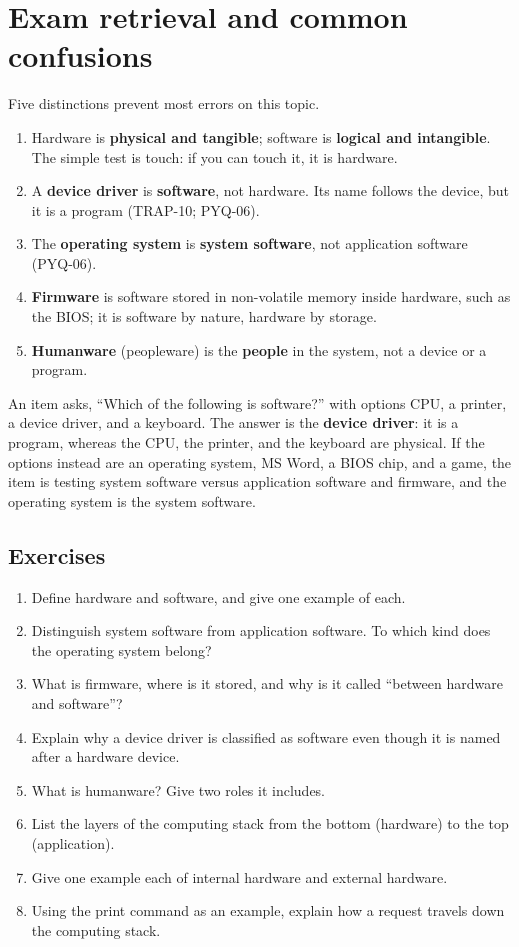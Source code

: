 \section{Exam retrieval and common confusions}
Five distinctions prevent most errors on this topic.
\begin{enumerate}
  \item Hardware is \textbf{physical and tangible}; software is
    \textbf{logical and intangible}. The simple test is touch: if you can
    touch it, it is hardware.
  \item A \textbf{device driver} is \textbf{software}, not hardware. Its name
    follows the device, but it is a program (TRAP-10; PYQ-06).
  \item The \textbf{operating system} is \textbf{system software}, not
    application software (PYQ-06).
  \item \textbf{Firmware} is software stored in non-volatile memory inside
    hardware, such as the BIOS; it is software by nature, hardware by storage.
  \item \textbf{Humanware} (peopleware) is the \textbf{people} in the system,
    not a device or a program.
\end{enumerate}

\begin{example}
An item asks, ``Which of the following is software?'' with options CPU, a
printer, a device driver, and a keyboard. The answer is the \textbf{device
driver}: it is a program, whereas the CPU, the printer, and the keyboard are
physical. If the options instead are an operating system, MS Word, a BIOS
chip, and a game, the item is testing system software versus application
software and firmware, and the operating system is the system software.
\end{example}

\subsection*{Exercises}
\begin{enumerate}[label=\arabic*.]
  \item Define hardware and software, and give one example of each.
  \item Distinguish system software from application software. To which kind
    does the operating system belong?
  \item What is firmware, where is it stored, and why is it called ``between
    hardware and software''?
  \item Explain why a device driver is classified as software even though it
    is named after a hardware device.
  \item What is humanware? Give two roles it includes.
  \item List the layers of the computing stack from the bottom (hardware) to
    the top (application).
  \item Give one example each of internal hardware and external hardware.
  \item Using the print command as an example, explain how a request travels
    down the computing stack.
\end{enumerate}

